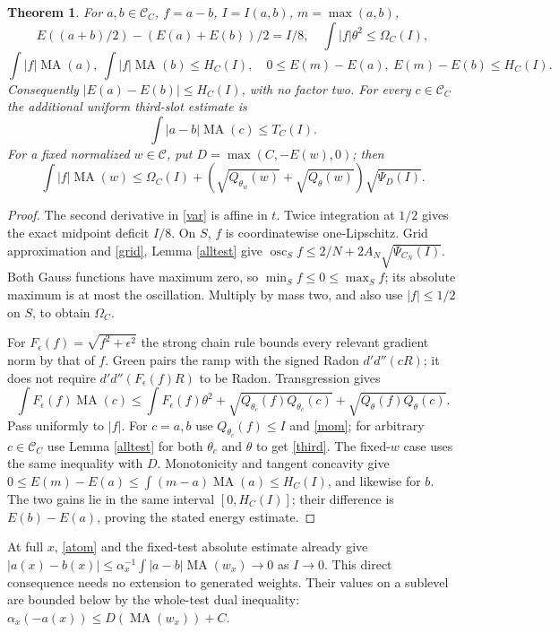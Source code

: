 \documentclass[11pt]{article}
\newtheorem{theorem}{Theorem}
\newcommand{\DD}{d'd''}
\newcommand{\MA}{\operatorname{MA}}
\newcommand{\C}{\mathcal C}
\begin{document}
\begin{theorem}\label{nonorder}
For $a,b\in\C_C$, $f=a-b$, $I=I(a,b)$, $m=\max(a,b)$,
\[
 E((a+b)/2)-(E(a)+E(b))/2=I/8,
 \quad\int|f|\theta^2\le\Omega_C(I),
\]
\[
 \int|f|\MA(a),\ \int|f|\MA(b)\le H_C(I),\quad
 0\le E(m)-E(a),\ E(m)-E(b)\le H_C(I).
\]
Consequently $|E(a)-E(b)|\le H_C(I)$, with no factor two.
For every $c\in\C_C$ the additional uniform third-slot estimate is
\begin{equation}\label{third}
 \int|a-b|\MA(c)\le T_C(I).
\end{equation}
For a fixed normalized $w\in\C$, put $D=\max(C,-E(w),0)$; then
\[
 \int|f|\MA(w)\le\Omega_C(I)+
 (\sqrt{Q_{\theta_w}(w)}+\sqrt{Q_\theta(w)})\sqrt{\Psi_D(I)}.
\]
\end{theorem}
\begin{proof}
The second derivative in \eqref{var} is affine in $t$. Twice integration
at $1/2$ gives the exact midpoint deficit $I/8$.
On $S$, $f$ is coordinatewise one-Lipschitz. Grid approximation and
\eqref{grid}, Lemma \ref{alltest} give
$\operatorname{osc}_S f\le2/N+2A_N\sqrt{\Psi_{C_N}(I)}$.
Both Gauss functions have maximum zero, so $\min_Sf\le0\le\max_Sf$;
its absolute maximum is at most the oscillation. Multiply by mass two,
and also use $|f|\le1/2$ on $S$, to obtain $\Omega_C$.

For $F_\epsilon(f)=\sqrt{f^2+\epsilon^2}$ the strong chain rule
bounds every relevant gradient norm by that of $f$. Green pairs the
ramp with the signed Radon $\DD(cR)$; it does not require
$\DD(F_\epsilon(f)R)$ to be Radon. Transgression gives
\[
 \int F_\epsilon(f)\MA(c)\le\int F_\epsilon(f)\theta^2+
 \sqrt{Q_{\theta_c}(f)Q_{\theta_c}(c)}+
 \sqrt{Q_\theta(f)Q_\theta(c)}.
\]
Pass uniformly to $|f|$. For $c=a,b$ use $Q_{\theta_c}(f)\le I$
and \eqref{mom}; for arbitrary $c\in\C_C$ use
Lemma \ref{alltest} for both $\theta_c$ and $\theta$ to get
\eqref{third}. The fixed-$w$ case uses the same inequality with $D$.
Monotonicity and tangent concavity give
$0\le E(m)-E(a)\le\int(m-a)\MA(a)\le H_C(I)$, and likewise
for $b$. The two gains lie in the same interval $[0,H_C(I)]$; their
difference is $E(b)-E(a)$, proving the stated energy estimate.
\end{proof}

At full $x$, \eqref{atom} and the fixed-test absolute estimate already
give $|a(x)-b(x)|\le\alpha_x^{-1}\int|a-b|\MA(w_x)\to0$ as
$I\to0$. This direct consequence needs no extension to generated weights.
Their values on a sublevel are bounded below by the whole-test dual
inequality: $\alpha_x(-a(x))\le D(\MA(w_x))+C$.
\end{document}
